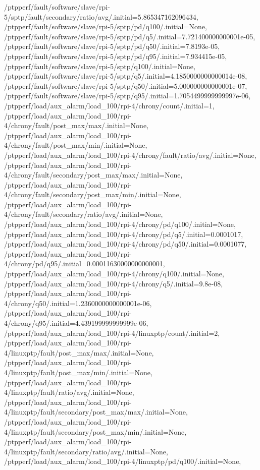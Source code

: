 {    /ptpperf/fault/software/slave/rpi-5/sptp/fault/secondary/ratio/avg/.initial=5.865347162096434,
    /ptpperf/fault/software/slave/rpi-5/sptp/pd/q100/.initial=None,
    /ptpperf/fault/software/slave/rpi-5/sptp/pd/q5/.initial=7.721400000000001e-05,
    /ptpperf/fault/software/slave/rpi-5/sptp/pd/q50/.initial=7.8193e-05,
    /ptpperf/fault/software/slave/rpi-5/sptp/pd/q95/.initial=7.934415e-05,
    /ptpperf/fault/software/slave/rpi-5/sptp/q100/.initial=None,
    /ptpperf/fault/software/slave/rpi-5/sptp/q5/.initial=4.1850000000000014e-08,
    /ptpperf/fault/software/slave/rpi-5/sptp/q50/.initial=5.000000000000001e-07,
    /ptpperf/fault/software/slave/rpi-5/sptp/q95/.initial=1.7054499999999997e-06,
    /ptpperf/load/aux_alarm/load_100/rpi-4/chrony/count/.initial=1,
    /ptpperf/load/aux_alarm/load_100/rpi-4/chrony/fault/post_max/max/.initial=None,
    /ptpperf/load/aux_alarm/load_100/rpi-4/chrony/fault/post_max/min/.initial=None,
    /ptpperf/load/aux_alarm/load_100/rpi-4/chrony/fault/ratio/avg/.initial=None,
    /ptpperf/load/aux_alarm/load_100/rpi-4/chrony/fault/secondary/post_max/max/.initial=None,
    /ptpperf/load/aux_alarm/load_100/rpi-4/chrony/fault/secondary/post_max/min/.initial=None,
    /ptpperf/load/aux_alarm/load_100/rpi-4/chrony/fault/secondary/ratio/avg/.initial=None,
    /ptpperf/load/aux_alarm/load_100/rpi-4/chrony/pd/q100/.initial=None,
    /ptpperf/load/aux_alarm/load_100/rpi-4/chrony/pd/q5/.initial=0.0001017,
    /ptpperf/load/aux_alarm/load_100/rpi-4/chrony/pd/q50/.initial=0.0001077,
    /ptpperf/load/aux_alarm/load_100/rpi-4/chrony/pd/q95/.initial=0.00011630000000000001,
    /ptpperf/load/aux_alarm/load_100/rpi-4/chrony/q100/.initial=None,
    /ptpperf/load/aux_alarm/load_100/rpi-4/chrony/q5/.initial=9.8e-08,
    /ptpperf/load/aux_alarm/load_100/rpi-4/chrony/q50/.initial=1.2360000000000001e-06,
    /ptpperf/load/aux_alarm/load_100/rpi-4/chrony/q95/.initial=4.439199999999999e-06,
    /ptpperf/load/aux_alarm/load_100/rpi-4/linuxptp/count/.initial=2,
    /ptpperf/load/aux_alarm/load_100/rpi-4/linuxptp/fault/post_max/max/.initial=None,
    /ptpperf/load/aux_alarm/load_100/rpi-4/linuxptp/fault/post_max/min/.initial=None,
    /ptpperf/load/aux_alarm/load_100/rpi-4/linuxptp/fault/ratio/avg/.initial=None,
    /ptpperf/load/aux_alarm/load_100/rpi-4/linuxptp/fault/secondary/post_max/max/.initial=None,
    /ptpperf/load/aux_alarm/load_100/rpi-4/linuxptp/fault/secondary/post_max/min/.initial=None,
    /ptpperf/load/aux_alarm/load_100/rpi-4/linuxptp/fault/secondary/ratio/avg/.initial=None,
    /ptpperf/load/aux_alarm/load_100/rpi-4/linuxptp/pd/q100/.initial=None,
}
